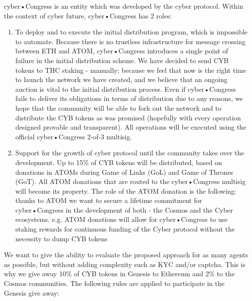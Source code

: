 \documentclass[8pt,oneside]{amsart}
\begin{document}
\begin{Abstract}
cyber•Congress is an entity which was developed by the cyber protocol. Within the context of cyber future, cyber•Congress has 2 roles:
\begin{enumerate}
 \item To deploy and to execute the initial distribution program, which is impossible to automate. Because there is no trustless infrastructure for message crossing between ETH and ATOM, cyber•Congress introduces a single point of failure in the initial distribution scheme. We have decided to send CYB tokens to THC staking - manually; because we feel that now is the right time to launch the network we have created, and we believe that an ongoing auction is vital to the initial distribution process. Even if cyber•Congress fails to deliver its obligations in terms of distribution due to any reasons, we hope that the community will be able to fork out the network and to distribute the CYB tokens as was promised (hopefully with every operation designed provable and transparent). All operations will be executed using the official cyber•Congress 2-of-3 multisig.
 \item Support for the growth of cyber protocol until the community takes over the development. Up to 15\% of CYB tokens will be distributed, based on donations in ATOMs during Game of Links (GoL) and Game of Thrones (GoT). All ATOM donations that are routed to the cyber•Congress multisig will become its property. The role of the ATOM donation is the following: thanks to ATOM we want to secure a lifetime commitment for cyber•Congress in the development of both - the Cosmos and the Cyber ecosystems. e.g. ATOM donations will allow for cyber•Congress to use staking rewards for continuous funding of the Cyber protocol without the necessity to dump CYB tokens
\end{enumerate}

We want to give the ability to evaluate the proposed approach for as many agents as possible, but without adding complexity such as KYC and/or captcha. This is why we give away 10\% of CYB tokens in Genesis to Ethereum and 2\% to the Cosmos communities. The following rules are applied to participate in the Genesis give away:


\end{Abstract}
\end{document}
